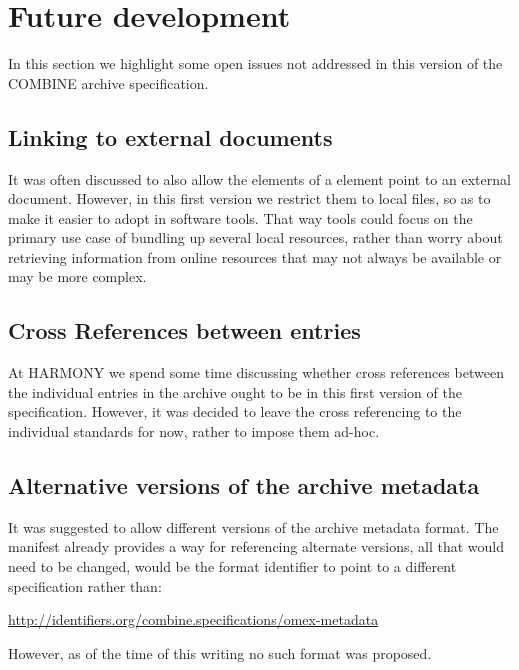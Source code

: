 
\section{Future development}
\label{future}
In this section we highlight some open issues not addressed in this 
version of the COMBINE archive specification. 


\subsection{Linking to external documents}
It was often discussed to also allow the  elements of a 
\Content element point to an external document. However, in this first 
version we restrict them to local files, so as to make it easier to 
adopt in software tools. That way tools could focus on the primary use 
case of bundling up several local resources, rather than worry about 
retrieving information from online resources that may not always be 
available or may be more complex.

\subsection{Cross References between entries}
At HARMONY we spend some time discussing whether cross references 
between the individual entries in the archive ought to be in this first 
version of the specification. However, it was decided to leave the cross 
referencing to the individual standards for now, rather to impose them 
ad-hoc. 

\subsection{Alternative versions of the archive metadata}
It was suggested to allow different versions of the archive metadata 
format. The manifest already provides a way for referencing alternate 
versions, all that would need to be changed, would be the format 
identifier to point to a different specification rather than: 


\url{http://identifiers.org/combine.specifications/omex-metadata}

However, as of the time of this writing no such format was proposed.